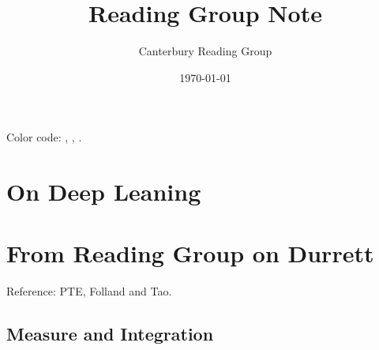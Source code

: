 \documentclass[12pt, oneside]{book}
\begin{document}
    \title{Reading Group Note}\author{Canterbury Reading Group}\date{\today}
    \tableofcontents
    Color code:  , , . 
    \chapter{On Deep Leaning}
    
    \chapter{From Reading Group on Durrett} Reference: PTE, Folland and Tao. 
        \section{Measure and Integration}

\end{document}
